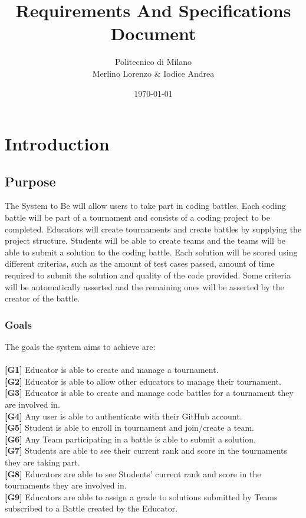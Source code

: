 \documentclass{article}
\title{Requirements And Specifications Document}
\author{
	Politecnico di Milano\\
	Merlino Lorenzo \& Iodice Andrea
}
\date{\today}
\begin{document}
\maketitle
\tableofcontents
\newpage
\section{Introduction}
\subsection{Purpose}
The System to Be will allow users to take part in coding battles. Each coding battle will be part of a tournament and consists of a coding project to be completed.
Educators will create tournaments and create battles by supplying the project structure. 
Students will be able to create teams and the teams will be able to submit a solution to the coding battle. Each solution will be scored using different criterias, such as the amount of test cases passed, amount of time required to submit the solution and quality of the code provided.
Some criteria will be automatically asserted and the remaining ones will be asserted by the creator of the battle.
\subsubsection{Goals}
The goals the system aims to achieve are:\\\\
\textbf{[G1]} Educator is able to create and manage a tournament.\\
\textbf{[G2]} Educator is able to allow other educators to manage their tournament.\\
\textbf{[G3]} Educator is able to create and manage code battles for a tournament they are involved in.\\
\textbf{[G4]} Any user is able to authenticate with their GitHub account. \\
\textbf{[G5]} Student is able to enroll in tournament and join/create a team.\\
\textbf{[G6]} Any Team participating in a battle is able to submit a solution.\\
\textbf{[G7]} Students are able to see their current rank and score in the tournaments they are taking part.\\
\textbf{[G8]} Educators are able to see Students’ current rank and score in the tournaments they are involved in.\\
\textbf{[G9]} Educators are able to assign a grade to solutions submitted by Teams subscribed to a Battle created by the Educator.\\
\end{document}

